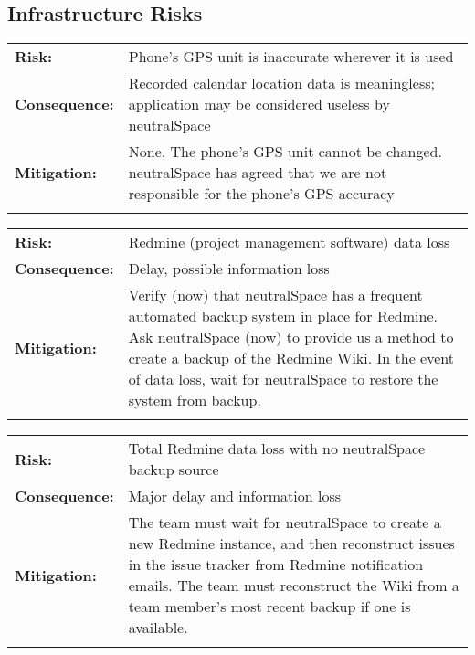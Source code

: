 \documentclass[11pt]{article}
\begin{document}
	\subsection{Infrastructure Risks}
		\begin{tabular}{lp{118mm}}\\
		{\bf Risk:}        & Phone's GPS unit is inaccurate wherever it is used \\
		{\bf Consequence:} & Recorded calendar location data is meaningless; application may be considered useless by neutralSpace\\
		{\bf Mitigation:}  & None. The phone's GPS unit cannot be changed. neutralSpace has agreed that we are not responsible for the phone's GPS accuracy\\\\
		\end{tabular}

		\begin{tabular}{lp{118mm}}\\
		{\bf Risk:}        & Redmine (project management software) data loss\\
		{\bf Consequence:} & Delay, possible information loss\\
		{\bf Mitigation:}  & Verify (now) that neutralSpace has a frequent automated backup system in place for Redmine. Ask neutralSpace (now) to provide us a method to create a backup of the Redmine Wiki. In the event of data loss, wait for neutralSpace to restore the system from backup.\\\\
		\end{tabular}

		\begin{tabular}{lp{118mm}}\\
		{\bf Risk:}        & Total Redmine data loss with no neutralSpace backup source\\
		{\bf Consequence:} & Major delay and information loss\\
		{\bf Mitigation:}  & The team must wait for neutralSpace to create a new Redmine instance, and then reconstruct issues in the issue tracker from Redmine notification emails. The team must reconstruct the Wiki from a team member's most recent backup if one is available.\\\\
		\end{tabular}
\end{document}
